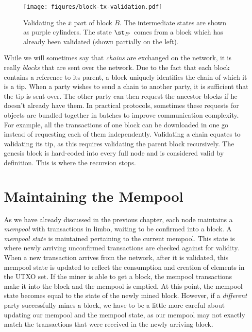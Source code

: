 \begin{figure}[h]
    \centering
    \texttt{[image: figures/block-tx-validation.pdf]}
    \caption{Validating the $\overline{x}$ part of block $B$. The intermediate states
             are shown as purple cylinders. The state $\st_{B'}$ comes from a block
             which has already been validated (shown partially on the left).}
    \label{fig.fee}
\end{figure}

While we will sometimes say that \emph{chains} are exchanged on the network, it is really
\emph{blocks} that are sent over the network. Due to the fact that each block contains
a reference to its parent, a block uniquely identifies the chain of which it is a tip.
When a party wishes to send a chain to another party, it is sufficient that the tip is
sent over. The other party can then request the ancestor blocks if he doesn't already
have them.
In practical protocols, sometimes these requests for objects are bundled
together in batches to improve communication complexity. For example, all the transactions
of one block can be downloaded in one go instead of requesting each of them independently.
Validating a chain equates to validating its tip, as this requires validating
the parent block recursively. The genesis block is hard-coded into every full node and is
considered valid by definition. This is where the recursion stops.

\section{Maintaining the Mempool}

As we have already discussed in the previous chapter, each node maintains a \emph{mempool}
with transactions in limbo, waiting to be confirmed into a block. A \emph{mempool state}
is maintained pertaining to the current mempool. This state is where newly arriving unconfirmed
transactions are checked against for validity. When a new transaction arrives from the network,
after it is validated, this mempool state is updated to reflect the consumption and creation
of elements in the UTXO set. If the miner is able to
get a block, the mempool transactions make it into the block and the mempool is emptied.
At this point, the mempool state becomes equal to the state of the newly mined block.
However, if a \emph{different} party successfully mines a block, we have to be a little
more careful about updating our mempool and the mempool state, as our mempool may not exactly
match the transactions that were received in the newly arriving block.

